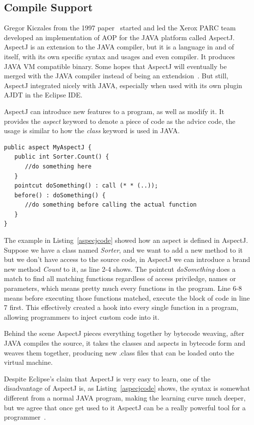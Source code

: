 \subsection{Compile Support}

Gregor Kiczales from the 1997 paper~\cite{aop} started and led the Xerox PARC team developed an implementation of AOP for the JAVA platform called AspectJ. AspectJ is an extension to the JAVA compiler, but it is a language in and of itself, with its own specific syntax and usages and even compiler. It produces JAVA VM compatible binary. Some hopes that AspectJ will eventually be merged with the JAVA compiler instead of being an extendsion~\cite{aspectj_faq}. But still, AspectJ integrated nicely with JAVA, especially when used with its own plugin AJDT in the Eclipse IDE.

AspectJ can introduce new features to a program, as well as modify it. It provides the {\em aspect} keyword to denote a piece of code as the advice code, the usage is similar to how the {\em class} keyword is used in JAVA.

\begin{lstlisting}[caption={sample aspectj code}, label=aspecjcode]
public aspect MyAspectJ {
   public int Sorter.Count() {
      //do something here
   }
   pointcut doSomething() : call (* * (..));
   before() : doSomething() {
      //do something before calling the actual function
   }
}
\end{lstlisting}

The example in Listing~\ref{aspecjcode} showed how an aspect is defined in AspectJ. Suppose we have a class named {\em Sorter}, and we want to add a new method to it but we don't have access to the source code, in AspectJ we can introduce a brand new method {\em Count} to it, as line 2-4 shows. The pointcut {\em doSomething} does a match to find all matching functions regardless of access priviledge, names or parameters, which means pretty much every functions in the program. Line 6-8 means before executing those functions matched, execute the block of code in line 7 first. This effectively created a hook into every single function in a program, allowing programmers to inject custom code into it.

Behind the scene AspectJ pieces everything together by bytecode weaving, after JAVA compiles the source, it takes the classes and aspects in bytecode form and weaves them together, producing new .class files that can be loaded onto the virtual machine.

Despite Eclipse's claim that AspectJ is very easy to learn, one of the disadvantage of AspectJ is, as Listing~\ref{aspecjcode} shows, the syntax is somewhat different from a normal JAVA program, making the learning curve much deeper, but we agree that once get used to it AspectJ can be a really powerful tool for a programmer~\cite{aspectj_text}.


